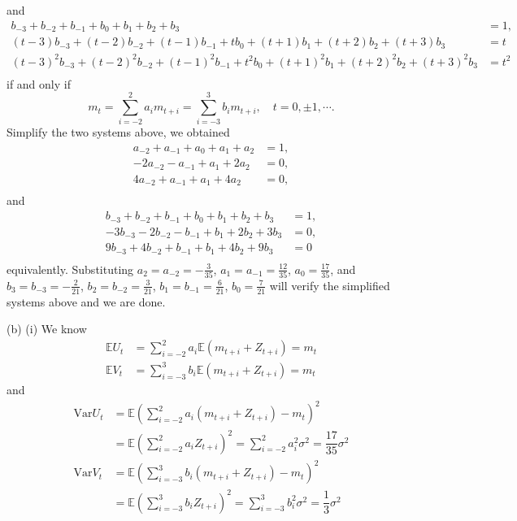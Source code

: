 \documentclass[lang=en,11pt,a4paper,citestyle =authoryear]{elegantpaper}
\begin{document}
and
\[
\begin{aligned}
    b_{-3} + b_{-2} + b_{-1} + b_0 + b_1 + b_2 + b_3&= 1, \\
    (t-3)b_{-3} + (t-2)b_{-2} + (t-1)b_{-1} + tb_0 + (t+1)b_1 + (t+2)b_2 + (t+3)b_3&= t \\
    (t-3)^2b_{-3} + (t-2)^2b_{-2} + (t-1)^2b_{-1} + t^2b_0 + (t+1)^2b_1 + (t+2)^2b_2 + (t+3)^2b_3&= t^2\\
\end{aligned}
\]
if and only if \[
    m_t = \sum\limits_{i=-2}^2 a_im_{t+i} = \sum\limits_{i=-3}^3 b_im_{t+i},\quad t = 0,\pm 1,\cdots.
    \]
Simplify the two systems above, we obtained
\[
\begin{aligned}
    a_{-2} + a_{-1} + a_0 + a_1 + a_2 &= 1, \\
    -2a_{-2} - a_{-1} + a_1 + 2a_2 &= 0, \\
    4a_{-2} + a_{-1} + a_1 + 4a_2 &= 0,\\
\end{aligned}
\]
and
\[
\begin{aligned}
    b_{-3} + b_{-2} + b_{-1} + b_0 + b_1 + b_2 + b_3&= 1, \\
    -3b_{-3} - 2b_{-2} - b_{-1} + b_1 + 2b_2 + 3b_3&= 0, \\
    9b_{-3} + 4b_{-2} + b_{-1} + b_1 + 4b_2 + 9b_3&= 0\\
\end{aligned}
\]
equivalently. Substituting $a_2 = a_{-2} = -\tfrac{3}{35}$, $a_1 = a_{-1} = \tfrac{12}{35}$, $a_0 = \tfrac{17}{35}$, and $b_3 = b_{-3} = -\tfrac{2}{21}$, $b_2 = b_{-2} = \tfrac{3}{21}$, $b_1 = b_{-1} = \tfrac{6}{21}$, $b_0 = \tfrac{7}{21}$ will verify the simplified systems above and we are done.\par
(b) (i) We know
\[
\begin{aligned}
    \mathbb{E}U_t &= \sum\limits_{i=-2}^2 a_i \mathbb{E}(m_{t+i} + Z_{t+i}) = m_t \\
    \mathbb{E}V_t &= \sum\limits_{i=-3}^3 b_i \mathbb{E}(m_{t+i} + Z_{t+i}) = m_t
\end{aligned}
\]
and
\[
\begin{aligned}
    \text{Var}U_t &= \mathbb{E}\left(\sum\limits_{i=-2}^2 a_i (m_{t+i} + Z_{t+i})-m_t\right)^2 \\
    &= \mathbb{E}\left(\sum\limits_{i=-2}^2 a_i Z_{t+i}\right)^2 =\sum\limits_{i=-2}^2 a_i^2 \sigma^2 = \dfrac{17}{35}\sigma^2 \\
    \text{Var}V_t &= \mathbb{E}\left(\sum\limits_{i=-3}^3 b_i (m_{t+i} + Z_{t+i})-m_t\right)^2 \\
    &= \mathbb{E}\left(\sum\limits_{i=-3}^3 b_i Z_{t+i}\right)^2 =\sum\limits_{i=-3}^3 b_i^2 \sigma^2 = \dfrac{1}{3}\sigma^2
\end{aligned}
\]
\end{document}
